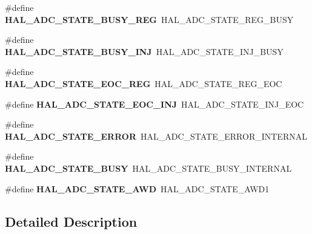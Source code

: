 \begin{DoxyCompactItemize}
\#define {\bfseries H\+A\+L\+\_\+\+A\+D\+C\+\_\+\+S\+T\+A\+T\+E\+\_\+\+B\+U\+S\+Y\+\_\+\+R\+EG}~H\+A\+L\+\_\+\+A\+D\+C\+\_\+\+S\+T\+A\+T\+E\+\_\+\+R\+E\+G\+\_\+\+B\+U\+SY
\item 
\mbox{\label{group___h_a_l___a_d_c___aliased___defines_ga9dc7360fd46380f3149e09780cd8f4b4}} 
\#define {\bfseries H\+A\+L\+\_\+\+A\+D\+C\+\_\+\+S\+T\+A\+T\+E\+\_\+\+B\+U\+S\+Y\+\_\+\+I\+NJ}~H\+A\+L\+\_\+\+A\+D\+C\+\_\+\+S\+T\+A\+T\+E\+\_\+\+I\+N\+J\+\_\+\+B\+U\+SY
\item 
\mbox{\label{group___h_a_l___a_d_c___aliased___defines_ga12555d013385a39ef776f1177420033c}} 
\#define {\bfseries H\+A\+L\+\_\+\+A\+D\+C\+\_\+\+S\+T\+A\+T\+E\+\_\+\+E\+O\+C\+\_\+\+R\+EG}~H\+A\+L\+\_\+\+A\+D\+C\+\_\+\+S\+T\+A\+T\+E\+\_\+\+R\+E\+G\+\_\+\+E\+OC
\item 
\mbox{\label{group___h_a_l___a_d_c___aliased___defines_ga2d1ddc7f0311b8faf6266a3e3c005c28}} 
\#define {\bfseries H\+A\+L\+\_\+\+A\+D\+C\+\_\+\+S\+T\+A\+T\+E\+\_\+\+E\+O\+C\+\_\+\+I\+NJ}~H\+A\+L\+\_\+\+A\+D\+C\+\_\+\+S\+T\+A\+T\+E\+\_\+\+I\+N\+J\+\_\+\+E\+OC
\item 
\mbox{\label{group___h_a_l___a_d_c___aliased___defines_ga83e3447e639d1a9019732255700ac23a}} 
\#define {\bfseries H\+A\+L\+\_\+\+A\+D\+C\+\_\+\+S\+T\+A\+T\+E\+\_\+\+E\+R\+R\+OR}~H\+A\+L\+\_\+\+A\+D\+C\+\_\+\+S\+T\+A\+T\+E\+\_\+\+E\+R\+R\+O\+R\+\_\+\+I\+N\+T\+E\+R\+N\+AL
\item 
\mbox{\label{group___h_a_l___a_d_c___aliased___defines_ga063cc0bfc15747a4c96d2868273a4516}} 
\#define {\bfseries H\+A\+L\+\_\+\+A\+D\+C\+\_\+\+S\+T\+A\+T\+E\+\_\+\+B\+U\+SY}~H\+A\+L\+\_\+\+A\+D\+C\+\_\+\+S\+T\+A\+T\+E\+\_\+\+B\+U\+S\+Y\+\_\+\+I\+N\+T\+E\+R\+N\+AL
\item 
\mbox{\label{group___h_a_l___a_d_c___aliased___defines_ga3147b9039ee1bc08da805d57a5136cd1}} 
\#define {\bfseries H\+A\+L\+\_\+\+A\+D\+C\+\_\+\+S\+T\+A\+T\+E\+\_\+\+A\+WD}~H\+A\+L\+\_\+\+A\+D\+C\+\_\+\+S\+T\+A\+T\+E\+\_\+\+A\+W\+D1
\end{DoxyCompactItemize}


\subsection{Detailed Description}
